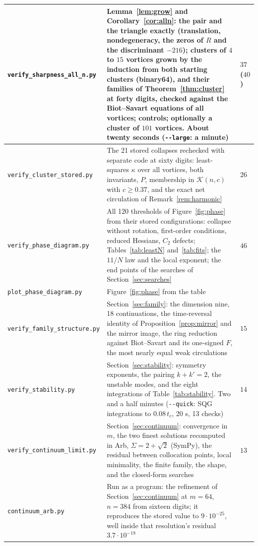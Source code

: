 \documentclass[11pt]{article}
\theoremstyle{definition}
\newcommand{\K}{\mathcal{K}}
\begin{document}
{\begin{longtable}{|>{\raggedright\arraybackslash}p{}|>{\raggedright\arraybackslash}p{}|>{\raggedleft\arraybackslash}p{}|}
  \texttt{verify\_\allowbreak sharpness\_\allowbreak all\_\allowbreak n.py} & Lemma~\ref{lem:grow} and Corollary~\ref{cor:alln}: the pair and the triangle exactly (translation, nondegeneracy, the zeros of $R$ and the discriminant $-216$); clusters of $4$ to $15$ vortices grown by the induction from both starting clusters (binary64), and their families of Theorem~\ref{thm:cluster} at forty digits, checked against the Biot--Savart equations of all vortices; controls; optionally a cluster of $101$ vortices. About twenty seconds (\texttt{-{}-large}: a minute) & $37$ ($40$) \\ \hline
  \texttt{verify\_\allowbreak cluster\_\allowbreak stored.py} & The 21 stored collapses rechecked with separate code at sixty digits: least-squares $\kappa$ over all vortices, both invariants, $P$, membership in $\K(n, c)$ with $c \ge 0.37$, and the exact net circulation of Remark~\ref{rem:harmonic} & $26$ \\ \hline
  \texttt{verify\_\allowbreak phase\_\allowbreak diagram.py} & All 120 thresholds of Figure~\ref{fig:phase} from their stored configurations: collapse without rotation, first-order conditions, reduced Hessians, $C_2$ defects; Tables~\ref{tab:leastN} and~\ref{tab:fits}; the $11/N$ law and the local exponent; the end points of the searches of Section~\ref{sec:searches} & $46$ \\ \hline
  \texttt{plot\_\allowbreak phase\_\allowbreak diagram.py} & Figure~\ref{fig:phase} from the table & \\ \hline
  \texttt{verify\_\allowbreak family\_\allowbreak structure.py} & Section~\ref{sec:family}: the dimension nine, 18 continuations, the time-reversal identity of Proposition~\ref{prop:mirror} and the mirror image, the ring reduction against Biot--Savart and its one-signed $F$, the most nearly equal weak circulations & $15$ \\ \hline
  \texttt{verify\_\allowbreak stability.py} & Section~\ref{sec:stability}: symmetry exponents, the pairing $k + k' = 2$, the unstable modes, and the eight integrations of Table~\ref{tab:stability}. Two and a half minutes (\texttt{-{}-quick}: SQG integrations to $0.08\,t_c$, 20 s, 13 checks) & $14$ \\ \hline
  \texttt{verify\_\allowbreak continuum\_\allowbreak limit.py} & Section~\ref{sec:continuum}: convergence in $m$, the two finest solutions recomputed in Arb, $\Sigma = 2 + \sqrt{2}$ (SymPy), the residual between collocation points, local minimality, the finite family, the shape, and the closed-form searches & $13$ \\ \hline
  \texttt{continuum\_\allowbreak arb.py} & Run as a program: the refinement of Section~\ref{sec:continuum} at $m = 64$, $n = 384$ from sixteen digits; it reproduces the stored value to $9 \cdot 10^{-25}$, well inside that resolution's residual $3.7 \cdot 10^{-18}$ & \\ \hline
\end{longtable}
}
\end{document}
